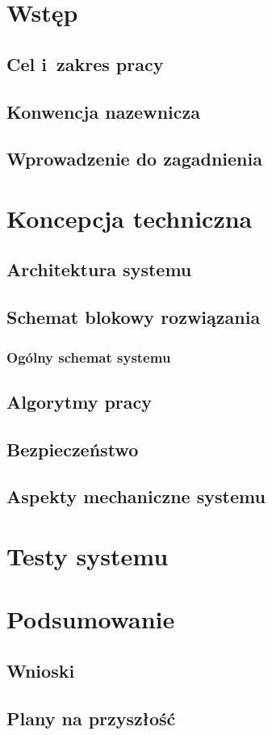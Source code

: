 \section{Wstęp}
\suppressfloats[t]  %

\subsection{Cel i~zakres pracy}

\subsection{Konwencja nazewnicza}

\subsection{Wprowadzenie do zagadnienia}

\section{Koncepcja techniczna}
\subsection{Architektura systemu}

\subsection{Schemat blokowy rozwiązania}
\subsubsection{Ogólny schemat systemu}

\subsection{Algorytmy pracy}

\subsection{Bezpieczeństwo}

\subsection{Aspekty mechaniczne systemu}

\section{Testy systemu}

\section{Podsumowanie}

\subsection{Wnioski}

\subsection{Plany na przyszłość}
